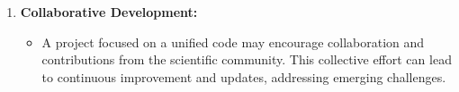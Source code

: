 \documentclass{article}
\begin{document}
\begin{enumerate}
    \item \textbf{Collaborative Development:}
    \begin{itemize}
        \item A project focused on a unified code may encourage collaboration and contributions from the scientific community. This collective effort can lead to continuous improvement and updates, addressing emerging challenges.
    \end{itemize}
\end{enumerate}
\end{document}
